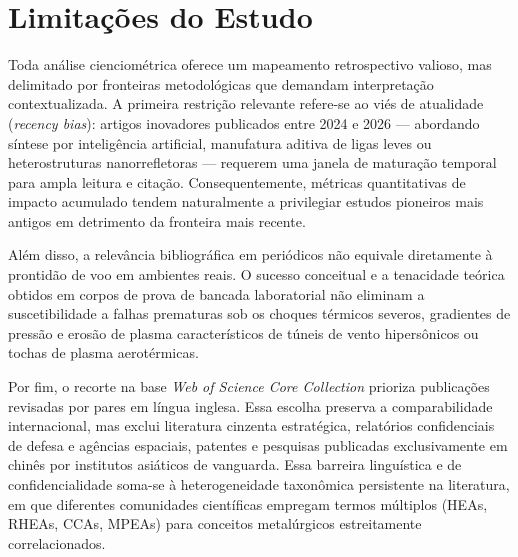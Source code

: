 \section{Limitações do Estudo}\label{sec:limitacoes}

Toda análise cienciométrica oferece um mapeamento retrospectivo valioso, mas delimitado por fronteiras metodológicas que demandam interpretação contextualizada. A primeira restrição relevante refere-se ao viés de atualidade (\emph{recency bias}): artigos inovadores publicados entre 2024 e 2026 --- abordando síntese por inteligência artificial, manufatura aditiva de ligas leves ou heterostruturas nanorrefletoras --- requerem uma janela de maturação temporal para ampla leitura e citação. Consequentemente, métricas quantitativas de impacto acumulado tendem naturalmente a privilegiar estudos pioneiros mais antigos em detrimento da fronteira mais recente.

Além disso, a relevância bibliográfica em periódicos não equivale diretamente à prontidão de voo em ambientes reais. O sucesso conceitual e a tenacidade teórica obtidos em corpos de prova de bancada laboratorial não eliminam a suscetibilidade a falhas prematuras sob os choques térmicos severos, gradientes de pressão e erosão de plasma característicos de túneis de vento hipersônicos ou tochas de plasma aerotérmicas.

Por fim, o recorte na base \emph{Web of Science Core Collection} prioriza publicações revisadas por pares em língua inglesa. Essa escolha preserva a comparabilidade internacional, mas exclui literatura cinzenta estratégica, relatórios confidenciais de defesa e agências espaciais, patentes e pesquisas publicadas exclusivamente em chinês por institutos asiáticos de vanguarda. Essa barreira linguística e de confidencialidade soma-se à heterogeneidade taxonômica persistente na literatura, em que diferentes comunidades científicas empregam termos múltiplos (HEAs, RHEAs, CCAs, MPEAs) para conceitos metalúrgicos estreitamente correlacionados.
